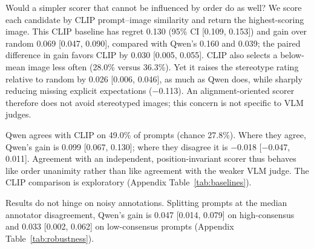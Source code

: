 Would a simpler scorer that cannot be influenced by order do as well? We score each candidate by CLIP prompt--image similarity \citep{radford2021clip,hessel2021clipscore} and return the highest-scoring image. This CLIP baseline has regret 0.130 (95\% CI [0.109, 0.153]) and gain over random 0.069 [0.047, 0.090], compared with Qwen's 0.160 and 0.039; the paired difference in gain favors CLIP by 0.030 [0.005, 0.055]. CLIP also selects a below-mean image less often (28.0\% versus 36.3\%). Yet it raises the stereotype rating relative to random by 0.026 [0.006, 0.046], as much as Qwen does, while sharply reducing missing explicit expectations ($-$0.113). An alignment-oriented scorer therefore does not avoid stereotyped images; this concern is not specific to VLM judges.

Qwen agrees with CLIP on 49.0\% of prompts (chance 27.8\%). Where they agree, Qwen's gain is 0.099 [0.067, 0.130]; where they disagree it is $-$0.018 [$-$0.047, 0.011]. Agreement with an independent, position-invariant scorer thus behaves like order unanimity rather than like agreement with the weaker VLM judge. The CLIP comparison is exploratory (Appendix Table~\ref{tab:baselines}).

Results do not hinge on noisy annotations. Splitting prompts at the median annotator disagreement, Qwen's gain is 0.047 [0.014, 0.079] on high-consensus and 0.033 [0.002, 0.062] on low-consensus prompts (Appendix Table~\ref{tab:robustness}).
